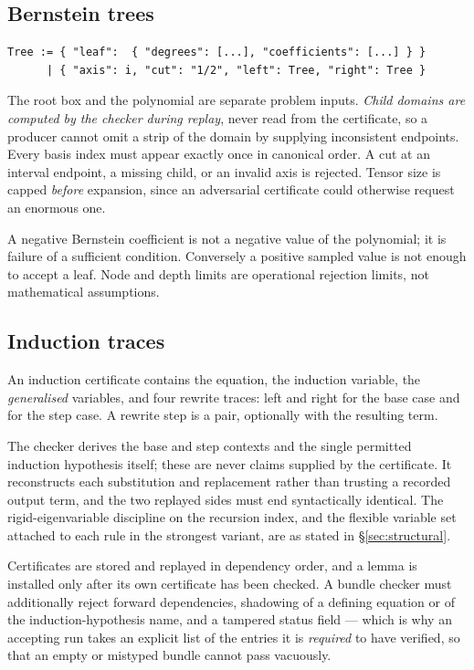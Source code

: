\subsection{Bernstein trees}

\begin{lstlisting}
Tree := { "leaf":  { "degrees": [...], "coefficients": [...] } }
      | { "axis": i, "cut": "1/2", "left": Tree, "right": Tree }
\end{lstlisting}

The root box and the polynomial are separate problem inputs. \emph{Child domains
are computed by the checker during replay}, never read from the certificate, so
a producer cannot omit a strip of the domain by supplying inconsistent
endpoints. Every basis index must appear exactly once in canonical order. A cut
at an interval endpoint, a missing child, or an invalid axis is rejected. Tensor
size is capped \emph{before} expansion, since an adversarial certificate could
otherwise request an enormous one.

A negative Bernstein coefficient is not a negative value of the polynomial; it
is failure of a sufficient condition. Conversely a positive sampled value is not
enough to accept a leaf. Node and depth limits are operational rejection limits,
not mathematical assumptions.

\subsection{Induction traces}

An induction certificate contains the equation, the induction variable, the
\emph{generalised} variables, and four rewrite traces: left and right for the
base case and for the step case. A rewrite step is a
 pair, optionally with the resulting
term.

The checker derives the base and step contexts and the single permitted
induction hypothesis itself; these are never claims supplied by the certificate.
It reconstructs each substitution and replacement rather than trusting a recorded
output term, and the two replayed sides must end syntactically identical. The
rigid-eigenvariable discipline on the recursion index, and the flexible variable
set attached to each rule in the strongest variant, are as stated in
\S\ref{sec:structural}.

Certificates are stored and replayed in dependency order, and a lemma is
installed only after its own certificate has been checked. A bundle checker must
additionally reject forward dependencies, shadowing of a defining equation or of
the induction-hypothesis name, and a tampered status field --- which is why an
accepting run takes an explicit list of the entries it is \emph{required} to
have verified, so that an empty or mistyped bundle cannot pass vacuously.


